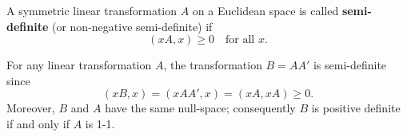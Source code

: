 A symmetric linear transformation $A$ on a Euclidean space is called \textbf{semi-definite} (or non-negative semi-definite) if
$$(xA, x) \geq 0 \quad \text{for all } x.$$

For any linear transformation $A$, the transformation $B = AA'$ is semi-definite since
$$(xB, x) = (xAA', x) = (xA, xA) \geq 0.$$
Moreover, $B$ and $A$ have the same null-space; consequently $B$ is positive definite if and only if $A$ is 1-1.
